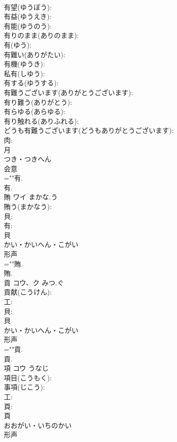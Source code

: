 \documentclass[8pt]{extreport}
\begin{document}
\begin{CJK}{UTF8}{min}
\\	有望(ゆうぼう): 
\\	有益(ゆうえき): 
\\	有能(ゆうのう): 
\\	有りのまま(ありのまま): 
\\	有(ゆう): 
\\	有難い(ありがたい): 
\\	有機(ゆうき): 
\\	私有(しゆう): 
\\	有する(ゆうする): 
\\	有難うございます(ありがとうございます): 
\\	有り難う(ありがとう): 
\\	有らゆる(あらゆる): 
\\	有り触れる(ありふれる): 
\\	どうも有難うございます(どうもありがとうございます): 
\\	肉: 
\\	月	
\\	つき・つきへん	
\\	会意 
\\	=""有.
\\	有.
\\	賄	ワイ	まかな.う		
\\	賄う(まかなう): 
\\	貝: 
\\	有: 
\\	貝	
\\	かい・かいへん・こがい	
\\	形声 
\\	=""賄.
\\	賄.
\\	貢	コウ、ク	みつ.ぐ		
\\	貢献(こうけん): 
\\	工: 
\\	貝: 
\\	貝	
\\	かい・かいへん・こがい	
\\	形声 
\\	=""貢.
\\	貢.
\\	項	コウ	うなじ		
\\	項目(こうもく): 
\\	事項(じこう): 
\\	工: 
\\	頁: 
\\	頁	
\\	おおがい・いちのかい	
\\	形声 

\end{CJK}
\end{document}

